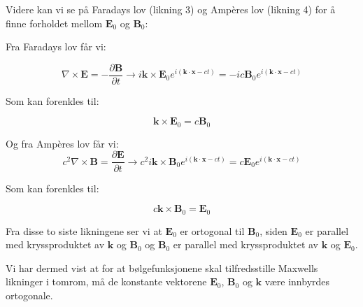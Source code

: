 Videre kan vi se på Faradays lov (likning 3) og Ampères lov (likning 4) for å finne forholdet mellom $\mathbf{E}_0$ og $\mathbf{B}_0$:

Fra Faradays lov får vi:

\begin{equation*}
\nabla \times \mathbf{E} = -\frac{\partial \mathbf{B}}{\partial t} \rightarrow i \mathbf{k} \times \mathbf{E}_0 e^{i(\mathbf{k} \cdot \mathbf{x}-ct)} = -i c \mathbf{B}_0 e^{i(\mathbf{k} \cdot \mathbf{x}-ct)}
\end{equation*}

Som kan forenkles til:

\begin{equation*}
\mathbf{k} \times \mathbf{E}_0 = c \mathbf{B}_0
\end{equation*}

Og fra Ampères lov får vi:
\begin{equation*}
    c^2 \nabla \times \mathbf{B} = \frac{\partial \mathbf{E}}{\partial t} \rightarrow c^2 i \mathbf{k} \times \mathbf{B}_0 e^{i(\mathbf{k} \cdot \mathbf{x}-ct)} = c \mathbf{E}_0 e^{i(\mathbf{k} \cdot \mathbf{x}-ct)}
\end{equation*}
    

Som kan forenkles til:

\begin{equation*}
c \mathbf{k} \times \mathbf{B}_0 = \mathbf{E}_0
\end{equation*}

Fra disse to siste likningene ser vi at $\mathbf{E}_0$ er ortogonal til $\mathbf{B}_0$, siden $\mathbf{E}_0$ er parallel med kryssproduktet av $\mathbf{k}$ og $\mathbf{B}_0$ og $\mathbf{B}_0$ er parallel med kryssproduktet av $\mathbf{k}$ og $\mathbf{E}_0$.

Vi har dermed vist at for at bølgefunksjonene skal tilfredsstille Maxwells likninger i tomrom, må de konstante vektorene $\mathbf{E}_0$, $\mathbf{B}_0$ og $\mathbf{k}$ være innbyrdes ortogonale.